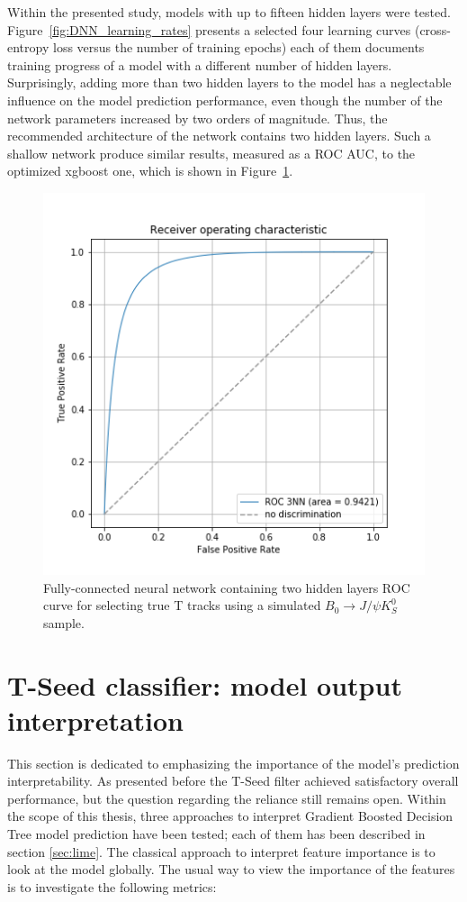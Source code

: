 Within the presented study, models with up to fifteen hidden layers were tested. Figure~\ref{fig:DNN_learning_rates} presents a selected four learning curves (cross-entropy loss versus the number of training epochs) each of them documents training progress of a model with a different number of hidden layers. Surprisingly, adding more than two hidden layers to the model has a neglectable influence on the model prediction performance, even though the number of the network parameters increased by two orders of magnitude. Thus, the recommended architecture of the network contains two hidden layers. Such a shallow network 
produce similar results, measured as a ROC AUC, to the optimized xgboost one, which is shown in Figure~\ref{fig:DNN_roc}.

\begin{figure}[!ht]
\centering
\includegraphics[scale=0.7]{figures/NN/roc_3nn.png}
\caption{ Fully-connected neural network containing two hidden layers ROC curve for selecting true T tracks using a simulated  $B_0\rightarrow J/\psi K_S^0 $ sample.      
\label{fig:DNN_roc}}
\end{figure}


\section{T-Seed classifier: model output interpretation}
\label{sec:interpretability}
This section is dedicated to emphasizing the importance of the model's prediction interpretability. As presented before the T-Seed filter achieved satisfactory overall performance, but the question regarding the reliance still remains open.
Within the scope of this thesis, three approaches to interpret Gradient Boosted Decision Tree model prediction have been tested; each of them has been described in section \ref{sec:lime}. 
The classical approach to interpret feature importance is to look at the model globally. The usual way to view the importance of the features is to investigate the following metrics: 


